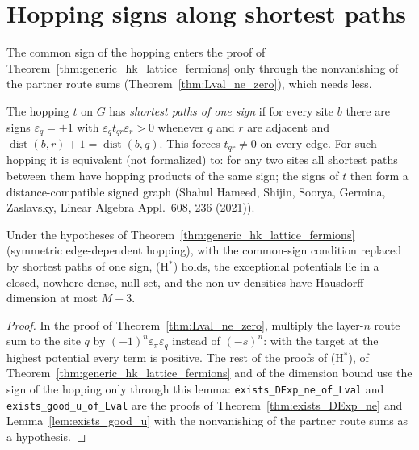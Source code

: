 \section{Hopping signs along shortest paths}

The common sign of the hopping enters the proof of Theorem~\ref{thm:generic_hk_lattice_fermions} only through the
nonvanishing of the partner route sums (Theorem~\ref{thm:Lval_ne_zero}), which needs less.

\begin{definition}
  \label{def:ShortestPathSigned}
  \leanok
  The hopping $t$ on $G$ has \emph{shortest paths of one sign} if for every site $b$ there are signs
  $\varepsilon_q=\pm1$ with $\varepsilon_q t_{qr}\varepsilon_r>0$ whenever $q$ and $r$ are adjacent and
  $\operatorname{dist}(b,r)+1=\operatorname{dist}(b,q)$. This forces $t_{qr}\neq0$ on every edge. For such hopping it is
  equivalent (not formalized) to: for any two sites all shortest paths between them have hopping products of the
  same sign; the signs
  of $t$ then form a distance-compatible signed graph (Shahul Hameed, Shijin, Soorya, Germina, Zaslavsky, Linear
  Algebra Appl.\ 608, 236 (2021)).
\end{definition}

\begin{theorem}
  \label{thm:generic_hk_shortest}
  \leanok
  Under the hypotheses of Theorem~\ref{thm:generic_hk_lattice_fermions} (symmetric edge-dependent hopping), with
  the common-sign condition replaced by shortest paths of one sign, (H$^*$) holds, the exceptional potentials lie in
  a closed, nowhere dense, null set, and the non-uv densities have Hausdorff dimension at most $M-3$.
\end{theorem}
\begin{proof}
  \leanok
  In the proof of Theorem~\ref{thm:Lval_ne_zero}, multiply the layer-$n$ route sum to the site $q$ by
  $(-1)^n\varepsilon_\pi\varepsilon_q$ instead of $(-s)^n$: with the target at the highest potential every term
  is positive. The rest of the proofs of (H$^*$), of Theorem~\ref{thm:generic_hk_lattice_fermions} and of the
  dimension bound use the sign of the hopping only through this lemma: \texttt{exists\_DExp\_ne\_of\_Lval} and
  \texttt{exists\_good\_u\_of\_Lval} are the proofs of Theorem~\ref{thm:exists_DExp_ne} and
  Lemma~\ref{lem:exists_good_u} with the nonvanishing of the partner route sums as a hypothesis.
\end{proof}


